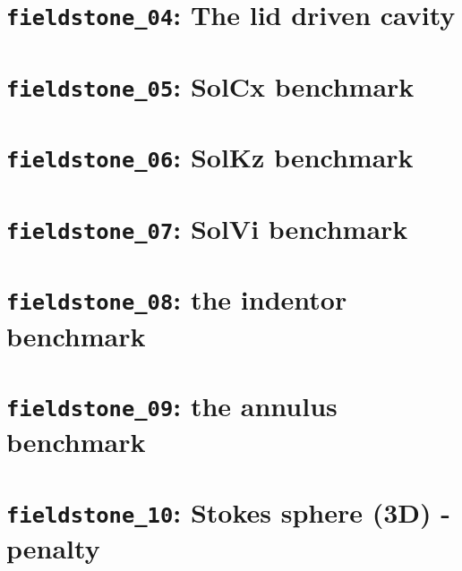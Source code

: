 \documentclass[a4paper]{article}
\begin{document}
\section{{\tt fieldstone\_04}: The lid driven cavity \label{f04}} %


\newpage %
\section{{\tt fieldstone\_05}: SolCx benchmark \label{f05}} %

\newpage
\section{{\tt fieldstone\_06}: SolKz benchmark \label{f06}}


\newpage
\section{{\tt fieldstone\_07}: SolVi benchmark \label{f07}}


\newpage
\section{{\tt fieldstone\_08}: the indentor benchmark \label{f08}}


\newpage
\section{{\tt fieldstone\_09}: the annulus benchmark \label{f09}}



\newpage
\section{{\tt fieldstone\_10}: Stokes sphere (3D) - penalty \label{f10}}

\end{document}
